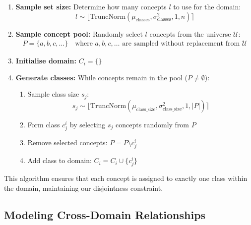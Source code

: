 \begin{enumerate}
    \item \textbf{Sample set size:} Determine how many concepts $l$ to use for the domain:
          \begin{equation*}
              l \sim \lfloor\text{TruncNorm}(\mu_{\text{classes}}, \sigma^2_{\text{classes}}, 1, n)\rceil
          \end{equation*}

    \item \textbf{Sample concept pool:} Randomly select $l$ concepts from the universe $\mathcal{U}$:
          \begin{align*}
              P = \{a, b, c, \ldots\} \quad \text{where } a, b, c, \ldots \text{ are sampled without replacement from } \mathcal{U}
          \end{align*}

    \item \textbf{Initialise domain:} $C_i = \{\}$

    \item \textbf{Generate classes:} While concepts remain in the pool ($P \neq \emptyset$):
          \begin{enumerate}
              \item Sample class size $s_j$:
                    \begin{equation*}
                        s_j \sim \lfloor\text{TruncNorm}(\mu_{\text{class\_size}}, \sigma^2_{\text{class\_size}}, 1, |P|)\rceil
                    \end{equation*}

              \item Form class $c^i_j$ by selecting $s_j$ concepts randomly from $P$

              \item Remove selected concepts: $P = P \setminus c_j^i$

              \item Add class to domain: $C_i = C_i \cup \{c^i_j\}$
          \end{enumerate}
\end{enumerate}

This algorithm ensures that each concept is assigned to exactly one class within the domain, maintaining our disjointness constraint.

\subsection{Modeling Cross-Domain Relationships}

